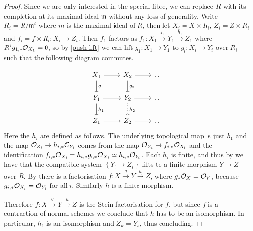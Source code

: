 \begin{proof}
	Since we are only interested in the special fibre, we can replace $R$ with its completion at its maximal ideal $\mathfrak{m}$ without any loss of generality.
	Write $R_{i}=R/\mathfrak{m}^{i}$ where $m$ is the maximal ideal of $R$, then let $X_{i}=X \times R_{i}$, $Z_{i}=Z\times R_{i}$ and $f_{i}=f\times R_{i}\colon X_{i} \to Z_{i}$.
	Then $f_{1}$ factors as $f_{1}\colon X_{1} \xrightarrow{g_{1}} Y_{1} \xrightarrow{h_{1}} Z_{1}$ where $R^{i}g_{1,*}\ox[X_{1}]=0$, so by \autoref{push-lift} we can lift $g_{1}\colon X_{1} \to Y_{1}$ to $g_{i}\colon X_{i} \to Y_{i}$ over $R_{i}$ such that the following diagram commutes.
	
	\[\begin{tikzcd}
	X_{1} \arrow[r] \arrow[d, "g_{1}"] & X_{2} \arrow[r] \arrow[d, "g_{2}"] & \dots \\
	Y_{1} \arrow[r] \arrow[d, "h_{1}"] & Y_{2} \arrow[d, dotted, "h_{2}"] \arrow[r]  & \dots \\
	Z_{1} \arrow[r]                    & Z_{2} \arrow[r]                    & \dots
	\end{tikzcd}\]
	Here the $h_{i}$ are defined as follows. The underlying topological map is just $h_{1}$ and the map $\ox[Z_{i}] \to h_{i,*}\ox[Y_{i}]$ comes from the map ${\ox[Z_{i}] \to f_{i,*}\ox[X_{i}]}$ and the identification $f_{i,*}\ox[X_{i}]=h_{i,*}g_{i,*}\ox[X_{i}]\simeq h_{i,*}\ox[Y_{i}]$.
	Each $h_{i}$ is finite, and thus by
	\cite[\href{https://stacks.math.columbia.edu/tag/09ZT}{Tag 09ZT}]{stacks-project} we have that the compatible system $\left\{Y_{i} \to Z_i \right\}$ lifts to a finite morphism $Y \to Z$ over $R$. By \cite[\href{https://stacks.math.columbia.edu/tag/0A42}{Tag 0A42}]{stacks-project} there is a factorisation ${f\colon X \xrightarrow{g} Y \xrightarrow{h} Z}$, where $g_{*}\ox = \cO_Y$, because $g_{i,*}\cO_{X_i}=\cO_{Y_i}$ for all $i$. Similarly $h$ is a finite morphism. 
	
	Therefore $f \colon X \xrightarrow{g} Y \xrightarrow{h} Z$ is the Stein factorisation for $f$, but since $f$ is a contraction of normal schemes we conclude that $h$ has to be an isomorphism.
	In particular, $h_1$ is an isomorphism and $Z_{k}=Y_{k}$, thus concluding.
\end{proof}

